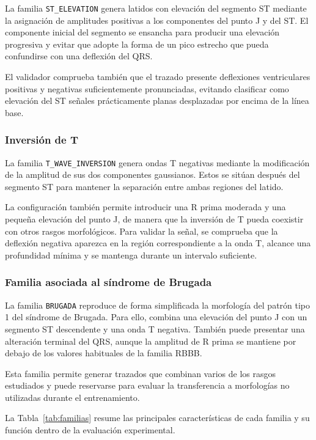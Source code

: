 La familia \texttt{ST\_ELEVATION} genera latidos con elevación del segmento ST mediante la asignación de amplitudes positivas a los componentes del punto J y del ST. El componente inicial del segmento se ensancha para producir una elevación progresiva y evitar que adopte la forma de un pico estrecho que pueda confundirse con una deflexión del QRS.

El validador comprueba también que el trazado presente deflexiones ventriculares positivas y negativas suficientemente pronunciadas, evitando clasificar como elevación del ST señales prácticamente planas desplazadas por encima de la línea base.

\subsubsection{Inversión de T}

La familia \texttt{T\_WAVE\_INVERSION} genera ondas T negativas mediante la modificación de la amplitud de sus dos componentes gaussianos. Estos se sitúan después del segmento ST para mantener la separación entre ambas regiones del latido.

La configuración también permite introducir una R prima moderada y una pequeña elevación del punto J, de manera que la inversión de T pueda coexistir con otros rasgos morfológicos. Para validar la señal, se comprueba que la deflexión negativa aparezca en la región correspondiente a la onda T, alcance una profundidad mínima y se mantenga durante un intervalo suficiente.

\subsubsection{Familia asociada al síndrome de Brugada}

La familia \texttt{BRUGADA} reproduce de forma simplificada la morfología del patrón tipo 1 del síndrome de Brugada. Para ello, combina una elevación del punto J con un segmento ST descendente y una onda T negativa. También puede presentar una alteración terminal del QRS, aunque la amplitud de R prima se mantiene por debajo de los valores habituales de la familia RBBB.

Esta familia permite generar trazados que combinan varios de los rasgos estudiados y puede reservarse para evaluar la transferencia a morfologías no utilizadas durante el entrenamiento.

La Tabla~\ref{tab:familias} resume las principales características de cada familia y su función dentro de la evaluación experimental.

